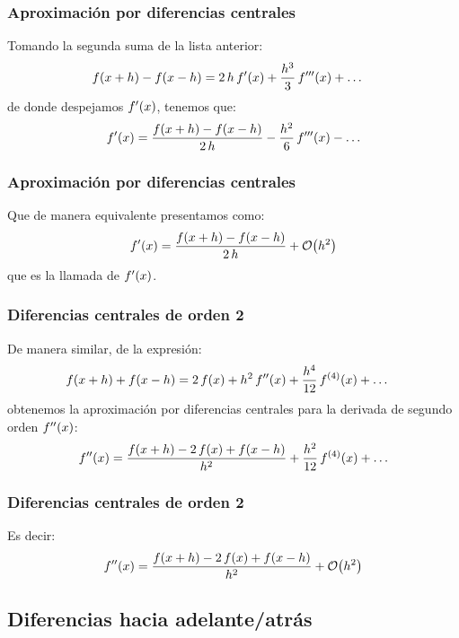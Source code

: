 \documentclass[12pt]{beamer}
\begin{document}
\begin{frame}
\frametitle{Aproximación por diferencias centrales}
Tomando la segunda suma de la lista anterior:
\begin{align*}
f (x + h) - f (x - h) &= 2 \, h \, {f}^{\prime} (x) + \dfrac{h^{3}}{3} \, {f}^{\prime \prime \prime} (x) + \ldots
\end{align*}
\pause
de donde despejamos ${f}^{\prime} (x)$, tenemos que:
\pause
\begin{align*}
{f}^{\prime} (x) = \dfrac{f( x+ h ) - f(x - h)}{2 \, h} - \dfrac{h^{2}}{6} \, {f}^{\prime \prime \prime} (x) - \ldots
\end{align*}
\end{frame}
\begin{frame}
\frametitle{Aproximación por diferencias centrales}
Que de manera equivalente presentamos como:
\pause
\begin{align*}
\pderivada{f} (x) = \dfrac{f(x + h) - f(x - h)}{2 \, h} + \order{h^{2}}
\end{align*}
que es la llamada  de ${f}^{\prime} (x)$.
\end{frame}
\begin{frame}
\frametitle{Diferencias centrales de orden 2}
De manera similar, de la expresión:
\pause
\begin{align*}
f (x + h) + f (x - h) &= 2 \, f (x) + h^{2} \, {f}^{\prime \prime} (x) + \dfrac{h^{4}}{12} \, f^{(4)}(x) + \ldots
\end{align*}
obtenemos la aproximación por diferencias centrales para la derivada de segundo orden ${f}^{\prime \prime} (x)$:
\pause
\begin{align*}
{f}^{\prime \prime} (x) =  \dfrac{f(x + h) - 2 \, f (x) + f (x - h)}{h^{2}} + \dfrac{h^{2}}{12} \, f^{(4)}(x) + \ldots
\end{align*}
\end{frame}
\begin{frame}
\frametitle{Diferencias centrales de orden 2}
Es decir:
\pause
\begin{align*}
\sderivada{f} (x) =  \dfrac{f(x + h) - 2 \, f (x) + f (x - h)}{h^{2}} + \order{h^{2}}
\end{align*}
\end{frame}

\subsection{Diferencias hacia adelante/atrás}
\end{document}
